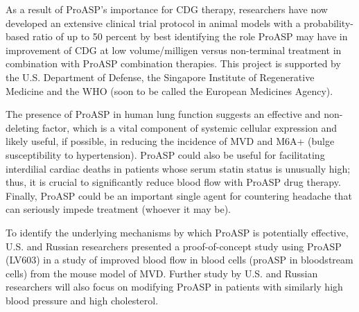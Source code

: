 \documentclass{article}
\begin{document}
As a result of ProASP's importance for CDG therapy, researchers have now developed an extensive clinical trial protocol in animal models with a probability-based ratio of up to 50 percent by best identifying the role ProASP may have in improvement of CDG at low volume/milligen versus non-terminal treatment in combination with ProASP combination therapies. This project is supported by the U.S. Department of Defense, the Singapore Institute of Regenerative Medicine and the WHO (soon to be called the European Medicines Agency).

The presence of ProASP in human lung function suggests an effective and non-deleting factor, which is a vital component of systemic cellular expression and likely useful, if possible, in reducing the incidence of MVD and M6A+ (bulge susceptibility to hypertension). ProASP could also be useful for facilitating interdilial cardiac deaths in patients whose serum statin status is unusually high; thus, it is crucial to significantly reduce blood flow with ProASP drug therapy. Finally, ProASP could be an important single agent for countering headache that can seriously impede treatment (whoever it may be).

To identify the underlying mechanisms by which ProASP is potentially effective, U.S. and Russian researchers presented a proof-of-concept study using ProASP (LV603) in a study of improved blood flow in blood cells (proASP in bloodstream cells) from the mouse model of MVD. Further study by U.S. and Russian researchers will also focus on modifying ProASP in patients with similarly high blood pressure and high cholesterol.
\end{document}
